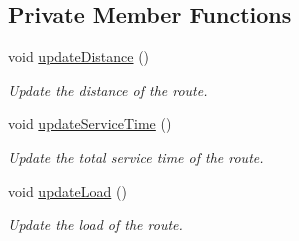 \subsection*{Private Member Functions}
\begin{DoxyCompactItemize}
\item 
\mbox{\label{class_route_ae6800543f5a50db543e1315e6a5468cd}} 
void \hyperlink{class_route_ae6800543f5a50db543e1315e6a5468cd}{update\+Distance} ()
\begin{DoxyCompactList}\small\item\em Update the distance of the route. \end{DoxyCompactList}\item 
\mbox{\label{class_route_a8054b36d0db39ba9321d30ed2410e138}} 
void \hyperlink{class_route_a8054b36d0db39ba9321d30ed2410e138}{update\+Service\+Time} ()
\begin{DoxyCompactList}\small\item\em Update the total service time of the route. \end{DoxyCompactList}\item 
\mbox{\label{class_route_a3f6ad4d322826950910265ea7b6c29c6}} 
void \hyperlink{class_route_a3f6ad4d322826950910265ea7b6c29c6}{update\+Load} ()
\begin{DoxyCompactList}\small\item\em Update the load of the route. \end{DoxyCompactList}\end{DoxyCompactItemize}
